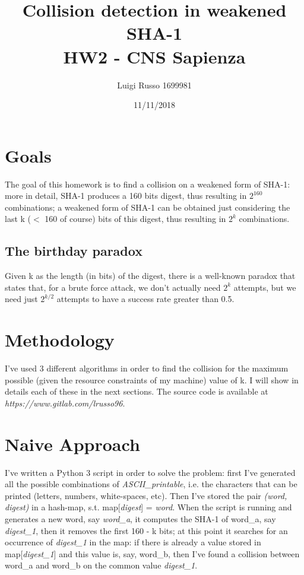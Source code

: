 \documentclass[11 pt]{article}
\title{
	Collision detection in weakened SHA-1 \\
	\large HW2 - CNS Sapienza}
\author{Luigi Russo 1699981}
\date{11/11/2018}
\begin{document}
\maketitle

\section{Goals}
The goal of this homework is to find a collision on a weakened form of SHA-1: more in detail, SHA-1 produces a 160 bits digest, thus resulting in $2^{160}$ combinations; a weakened form of SHA-1 can be obtained just considering the last k ($<$ 160 of course) bits of this digest, thus resulting in $2^k$ combinations.

\subsection{The birthday paradox}
Given k as the length (in bits) of the digest, there is a well-known paradox that states that, for a brute force attack, we don't actually need $2^k$ attempts, but we need just $2^{k/2}$ attempts to have a success rate greater than 0.5.

\section{Methodology}
I've used 3 different algorithms in order to find the collision for the maximum possible (given the resource constraints of my machine) value of k. I will show in details each of these in the next sections. The source code is available  at \textit{https://www.gitlab.com/lrusso96}.

\section{Naive Approach}
I've written a Python 3 script in order to solve the problem: first I've generated all the possible combinations of \textit{ASCII\_printable}, i.e. the characters that can be printed (letters, numbers, white-spaces, etc). Then I've stored the pair \textit{(word, digest)} in a hash-map, s.t. map[\textit{digest}] = \textit{word}. When the script is running and generates a new word, say \textit{word\_a}, it computes the SHA-1 of word\_a, say \textit{digest\_1},  then it removes the first 160 - k bits; at this point it searches for an occurrence of \textit{digest\_1} in the map: if there is already a value stored in map[\textit{digest\_1}] and this value is, say,  word\_b, then I've found a collision between word\_a and word\_b on the common value \textit{digest\_1}.
\end{document}
